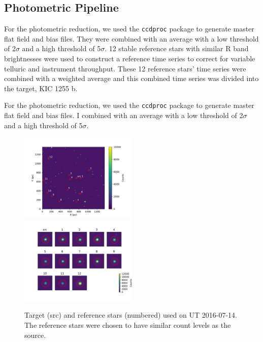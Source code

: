 \documentclass[preprint]{aastex61}
\newcommand{\sha}{KIC 1255 b}
\begin{document}
\subsection{Photometric Pipeline}

For the photometric reduction, we used the \texttt{ccdproc} package to generate master flat field and bias files.
They were combined with an average with a low threshold of 2$\sigma$ and a high threshold of 5$\sigma$.
12 stable reference stars with similar R band brightnesses were used to construct a reference time series to correct for variable telluric and instrument throughput.
These 12 reference stars' time series were combined with a weighted average and this combined time series was divided into the target, \sha.

For the photometric reduction, we used the \texttt{ccdproc} package to generate master flat field and bias files.
I combined with an average with a low threshold of 2$\sigma$ and a high threshold of 5$\sigma$.

\begin{figure}
\begin{centering}
\includegraphics[width=0.5\textwidth]{images/ut2016_07_14_clouds/figure_index_152.pdf}
\includegraphics[width=0.5\textwidth]{images/stamps_kic1255_UT2016_07_14.pdf}
\caption{Target (src) and reference stars (numbered) used on UT 2016-07-14.
The reference stars were chosen to have similar count levels as the source. 
}\label{fig:ut2016-07-14cloudImg}
\end{centering}
\end{figure}
\end{document}
